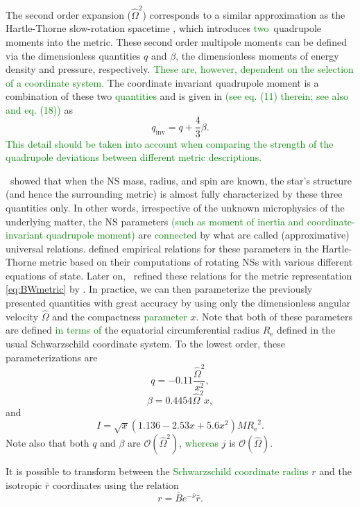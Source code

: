 \documentclass{aa}
\newcommand{\be}{\begin{equation}}
\newcommand{\ee}{\end{equation}}
\newcommand{\refe}[1]{\textcolor{green}{{#1}}}
\newcommand{\refedel}[1]{}
\newcommand{\Req}{\ensuremath{R_{\mathrm{e}}}}
\newcommand{\sch}{Schwarzschild }
\newcommand{\rb}{\ensuremath{\bar{r}}}
\newcommand{\Ob}{\ensuremath{\hat{\Omega}}}
\newcommand{\nub}{\ensuremath{\bar{\nu}}}
\newcommand{\Bb}{\ensuremath{\bar{B}}}
\newcommand{\qinv}{\ensuremath{q_{\mathrm{inv}}}}
\begin{document}
The second order expansion ($\Ob^2$) corresponds to a similar approximation as the Hartle-Thorne slow-rotation spacetime \citep{HT68}, which introduces \refe{two} quadrupole moments into the metric.  
These second order multipole moments can be defined via the dimensionless quantities $q$ and $\beta$, the dimensionless moments of energy density and pressure, respectively.
\refe{These are, however, dependent on the selection of a coordinate system.}
The coordinate invariant quadrupole moment\refedel{, on the other hand,} is a combination of these two \refedel{factors}\refe{quantities} and is given in \citet{PA12} \refe{(see eq. (11) therein; see also \citealt{aGM14} and eq. (18))} as
\be
\qinv =  q + \frac{4}{3} \beta.
\ee
\refe{This detail should be taken into account when comparing the strength of the quadrupole deviations between different metric descriptions.}


\citet{YY13} showed that when the NS mass, radius, and spin are known, the star's structure (and hence the surrounding metric) is almost fully characterized by these three quantities only. %
In other words, irrespective of the unknown microphysics of the underlying matter, the NS parameters \refe{(such as moment of inertia and coordinate-invariant quadrupole moment)} are \refe{connected} by what are called (approximative) universal relations.
\citet{BBP13} defined empirical relations for these parameters in the Hartle-Thorne metric based on their computations of rotating NSs with various different equations of state.
Later on, \citet{aGM14} refined these relations for the metric representation \eqref{eq:BWmetric} by \citet{BI76}.
In practice, we can then parameterize the previously presented quantities with great accuracy by using only the dimensionless angular velocity $\Ob$ and the compactness \refe{parameter} $x$.
Note that both of these parameters are defined \refe{in terms of} the equatorial circumferential radius $\Req$ defined in the usual \sch coordinate system.
To the lowest order, these parameterizations are \citep{aGM14}
\be\label{eq:quad}
q = -0.11 \frac{\Ob^2}{x^2},
\ee
\be\label{eq:beta}
\beta = 0.4454 \Ob^2 x,
\ee
and
\be\label{eq:I}
I = \sqrt{x} (1.136 - 2.53 x + 5.6 x^2) M \Req^2.
\ee
Note also that both $q$ and $\beta$ are $\mathcal{O}(\Ob^2)$, \refe{whereas} $j$ is $\mathcal{O}(\Ob)$.
    
It is possible to transform between the \refe{\sch coordinate radius} $r$ and the isotropic $\rb$ coordinates using the relation \citep{FIP86}
\be\label{eq:rb2r}
r = \Bb e^{-\nub} \rb.
\ee
\end{document}
